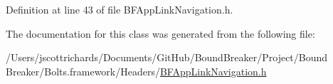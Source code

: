 Definition at line 43 of file B\+F\+App\+Link\+Navigation.\+h.



The documentation for this class was generated from the following file\+:\begin{DoxyCompactItemize}
\item 
/\+Users/jscottrichards/\+Documents/\+Git\+Hub/\+Bound\+Breaker/\+Project/\+Bound Breaker/\+Bolts.\+framework/\+Headers/\hyperlink{_b_f_app_link_navigation_8h}{B\+F\+App\+Link\+Navigation.\+h}\end{DoxyCompactItemize}
